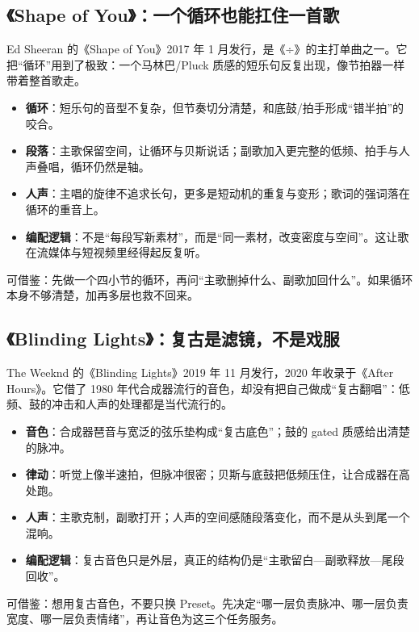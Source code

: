 \subsection{《Shape of You》：一个循环也能扛住一首歌}
\label{sec:pop-case-shape}

Ed Sheeran 的《Shape of You》2017 年 1 月发行，是《÷》的主打单曲之一。它把“循环”用到了极致：一个马林巴/Pluck 质感的短乐句反复出现，像节拍器一样带着整首歌走。

\begin{itemize}
\item \textbf{循环}：短乐句的音型不复杂，但节奏切分清楚，和底鼓/拍手形成“错半拍”的咬合。
\item \textbf{段落}：主歌保留空间，让循环与贝斯说话；副歌加入更完整的低频、拍手与人声叠唱，循环仍然是轴。
\item \textbf{人声}：主唱的旋律不追求长句，更多是短动机的重复与变形；歌词的强词落在循环的重音上。
\item \textbf{编配逻辑}：不是“每段写新素材”，而是“同一素材，改变密度与空间”。这让歌在流媒体与短视频里经得起反复听。
\end{itemize}

可借鉴：先做一个四小节的循环，再问“主歌删掉什么、副歌加回什么”。如果循环本身不够清楚，加再多层也救不回来。

\subsection{《Blinding Lights》：复古是滤镜，不是戏服}
\label{sec:pop-case-blinding-lights}

The Weeknd 的《Blinding Lights》2019 年 11 月发行，2020 年收录于《After Hours》。它借了 1980 年代合成器流行的音色，却没有把自己做成“复古翻唱”：低频、鼓的冲击和人声的处理都是当代流行的。

\begin{itemize}
\item \textbf{音色}：合成器琶音与宽泛的弦乐垫构成“复古底色”；鼓的 gated 质感给出清楚的脉冲。
\item \textbf{律动}：听觉上像半速拍，但脉冲很密；贝斯与底鼓把低频压住，让合成器在高处跑。
\item \textbf{人声}：主歌克制，副歌打开；人声的空间感随段落变化，而不是从头到尾一个混响。
\item \textbf{编配逻辑}：复古音色只是外层，真正的结构仍是“主歌留白—副歌释放—尾段回收”。
\end{itemize}

可借鉴：想用复古音色，不要只换 Preset。先决定“哪一层负责脉冲、哪一层负责宽度、哪一层负责情绪”，再让音色为这三个任务服务。

